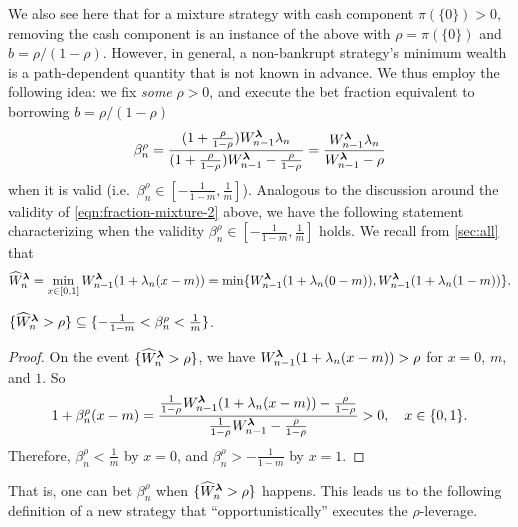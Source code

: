 We also see here that for a mixture strategy with cash component $\pi(\{0\}) > 0$, removing the cash component is an instance of the above with $\rho = \pi(\{0\})$ and $b =  \rho/(1-\rho)$. However, in general, a non-bankrupt strategy's minimum wealth is a path-dependent quantity that is not known in advance. We thus employ the following idea: we fix \emph{some} $\rho > 0$, and execute the bet fraction equivalent to borrowing $b=\rho/(1-\rho)$
\begin{equation}
    \beta_n^{\rho} = \frac{ (1+\frac{\rho}{1-\rho}) W_{n-1}^{\boldsymbol{\lambda}} \lambda_n }{(1+\frac{\rho}{1-\rho}) W_{n-1}^{\boldsymbol{\lambda}} - \frac{\rho}{1-\rho}} = \frac{W_{n-1}^{\boldsymbol{\lambda}} \lambda_n}{W_{n-1}^{\boldsymbol{\lambda}} - \rho}
\end{equation}
when it is valid (i.e.\ $\beta_n^\rho \in [-\frac{1}{1-m}, \frac{1}{m}]$). Analogous to the discussion around the validity of \eqref{eqn:fraction-mixture-2} above, we have the following statement characterizing when the validity $\beta_n^\rho \in [-\frac{1}{1-m}, \frac{1}{m}]$ holds. We recall from \cref{sec:all} that
\begin{equation}
    \widehat W_n^{\boldsymbol{\lambda}} = \min_{x \in [0,1] } W_{n-1}^{\boldsymbol{\lambda}}(1 + \lambda_n(x - m)) = \min\{ W_{n-1}^{\boldsymbol{\lambda}}(1 + \lambda_n(0 - m)),  W_{n-1}^{\boldsymbol{\lambda}}(1 + \lambda_n(1 - m))  \}.
\end{equation}
\begin{lemma}
    $\{ \widehat W_n^{\boldsymbol{\lambda}} > \rho \} \subseteq \{ -\frac{1}{1-m} < \beta_n^\rho < \frac{1}{m} \}$.
\end{lemma}
\begin{proof} On the event $\{ \widehat W_n^{\boldsymbol{\lambda}} > \rho \}$, 
    we have $W_{n-1}^{\boldsymbol{\lambda}}(1+ \lambda_n(x-m) ) > \rho$ for $x=0$, $m$, and $1$. So
    \begin{equation}
        1 + \beta_n^\rho(x - m) = \frac{\frac{1}{1-\rho}W_{n-1}^{\boldsymbol{\lambda}}(1+ \lambda_n(x-m) ) - \frac{\rho}{1-\rho}  }{\frac{1}{1-\rho}W_{n-1}^{\boldsymbol{\lambda}} - \frac{\rho}{1-\rho}} > 0, \quad x \in \{0, 1\}.
    \end{equation}
    Therefore, $\beta_n^\rho < \frac{1}{m}$ by $x = 0$, and $\beta_n^\rho > -\frac{1}{1-m}$ by $x=1$.
\end{proof}


That is, one can bet $\beta_n^\rho $ when $\{ \widehat W_n^{\boldsymbol{\lambda}} > \rho \}$ happens. This leads us to the following definition of a new strategy that ``opportunistically'' executes the $\rho$-leverage.

